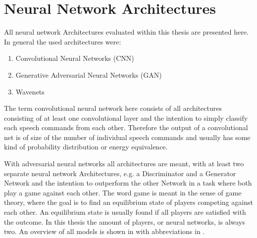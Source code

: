 
\section{Neural Network Architectures}\label{sec:nn_arch}
All neural network Architectures evaluated within this thesis are presented here.
In general the used architectures were:
\begin{enumerate}
	\item Convolutional Neural Networks (CNN)
	\item Generative Adversarial Neural Networks (GAN)
	\item Wavenets
\end{enumerate}
The term convolutional neural network here consists of all architectures consisting of at least one convolutional layer and the intention to simply classify each speech commands from each other. 
Therefore the output of a convolutional net is of size of the number of individual speech commands and usually has some kind of probability distribution or energy equivalence.

With adversarial neural networks all architectures are meant, with at least two separate neural network Architectures, e.g. a Discriminator and a Generator Network and the intention to outperform the other Network in a task where both play a game against each other.
The word game is meant in the sense of game theory, where the goal is to find an equilibrium state of players competing against each other.
An equilibrium state is usually found if all players are satisfied with the outcome.
In this thesis the amount of players, or neural networks, is always two.
An overview of all models is shown in  with abbreviations in .

